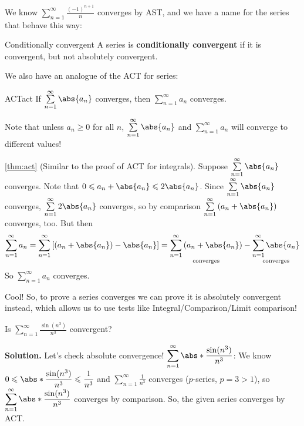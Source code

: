 We know $ \displaystyle \sum\limits_{n=1}^{\infty} \frac{(-1)^{n+1}}{n} $ converges by AST,
and we have a name for the series that behave this way:

\begin{Definition}{Conditionally convergent}{}
    A series is \textbf{conditionally convergent} if it is convergent, but
    not absolutely convergent.
\end{Definition}

We also have an analogue of the ACT for series:

\begin{Theorem}{ACT}{act}
    If $ \sum\limits_{n=1}^{\infty} \abs{a_n} $ converges, then $ \sum\limits_{n=1}^{\infty}a_n $
    converges.
\end{Theorem}

\begin{Remark}{}{}
    Note that unless $ a_n\geqslant 0 $ for all $ n $, $ \sum\limits_{n=1}^{\infty} \abs{a_n} $
    and $ \sum\limits_{n=1}^{\infty} a_n $ will converge to different values!
\end{Remark}

\begin{Proof}{\ref{thm:act}}{}
    (Similar to the proof of ACT for integrals). Suppose $ \sum\limits_{n=1}^{\infty}\abs{a_n} $
    converges. Note that $ 0\leqslant a_n+\abs{a_n}\leqslant 2\abs{a_n} $. Since
    $ \sum\limits_{n=1}^{\infty} \abs{a_n} $ converges, $ \sum\limits_{n=1}^{\infty} 2\abs{a_n} $
    converges, so by comparison $ \sum\limits_{n=1}^{\infty} \left( a_n+\abs{a_n} \right) $
    converges, too. But then
    \[ \sum\limits_{n=1}^{\infty}a_n
        =\sum\limits_{n=1}^{\infty} \left[ (a_n+\abs{a_n}) -\abs{a_n}\right]
        =\underset{\text{converges}}{\sum\limits_{n=1}^{\infty} \left( a_n+\abs{a_n} \right)}
        -\underset{\text{converges}}{\sum\limits_{n=1}^{\infty} \abs{a_n}}\]
    So $ \sum\limits_{n=1}^{\infty} a_n $ converges.
\end{Proof}

Cool! So, to prove a series converges we can prove it is absolutely convergent
instead, which allows us to use tests like Integral/Comparison/Limit comparison!

\begin{Example}{}{}
    Is $ \displaystyle \sum\limits_{n=1}^{\infty} \frac{\sin(n^3)}{n^3} $ convergent?

    \textbf{Solution.} Let's check absolute convergence!
    $ \displaystyle \sum\limits_{n=1}^{\infty} \abs*{\frac{\sin(n^3)}{n^3}} $: We know
    $ \displaystyle 0\leqslant \abs*{\frac{\sin(n^3)}{n^3}}\leqslant \frac{1}{n^3} $
    and $ \displaystyle \sum\limits_{n=1}^{\infty} \frac{1}{n^3} $ converges ($ p $-series, $ p=3>1 $),
    so $ \displaystyle \sum\limits_{n=1}^{\infty} \abs*{\frac{\sin(n^3)}{n^3} } $
    converges by comparison. So, the given series converges by ACT\@.
\end{Example}

